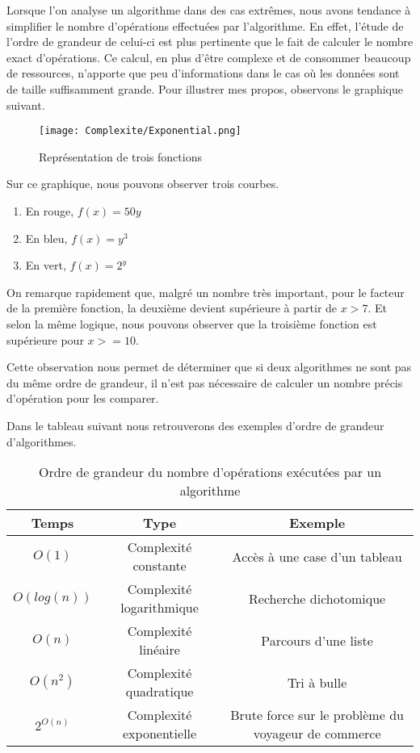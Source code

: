 \documentclass[12pt, twoside, openright]{report}
\begin{document}
Lorsque l'on analyse un algorithme dans des cas extrêmes, nous avons tendance à simplifier le nombre d'opérations effectuées par l'algorithme. En effet, l'étude de l'ordre de grandeur de celui-ci est plus pertinente que le fait de calculer le nombre exact d'opérations. Ce calcul, en plus d'être complexe et de consommer beaucoup de ressources, n'apporte que peu d'informations dans le cas où les données sont de taille suffisamment grande. Pour illustrer mes propos, observons le graphique suivant.

\begin{figure}[H]
    \centering
    \texttt{[image: Complexite/Exponential.png]}
    \caption{Représentation de trois fonctions}
    \label{fig:my_label}
\end{figure}

Sur ce graphique, nous pouvons observer trois courbes.

\begin{enumerate}
    \item En rouge, $f(x)=50y$
    \item En bleu, $f(x)=y^{3}$
    \item En vert, $f(x)=2^{y}$
\end{enumerate}

On remarque rapidement que, malgré un nombre très important, pour le facteur de la première fonction, la deuxième devient supérieure à partir de $x>7$. Et selon la même logique, nous pouvons observer que la troisième fonction est supérieure pour $x>=10$. 

Cette observation nous permet de déterminer que si deux algorithmes ne sont pas du même ordre de grandeur, il n'est pas nécessaire de calculer un nombre précis d'opération pour les comparer.

Dans le tableau suivant nous retrouverons des exemples d'ordre de grandeur d'algorithmes.  \cite{moore02} 
\begin{center}
    \begin{table}[H]
        \begin{tabular}{|c|c|c|}
            \hline 
    Temps & Type & Exemple \\ 
            \hline 
    $O(1)$        &Complexité constante&  Accès à une case d'un tableau\\ 
            \hline 
    $O(log(n))$       & Complexité logarithmique  & Recherche dichotomique \\ 
            \hline 
    $O(n)$        & Complexité linéaire & Parcours d'une liste \\ 
            \hline 
    $O(n^{2})$        & Complexité quadratique  & Tri à bulle \\ 
            \hline 
    $2^{O(n)}$ & Complexité exponentielle & Brute force sur le problème du voyageur de commerce \\
            \hline
        \end{tabular}
    \caption{\label{table:complexite}Ordre de grandeur du nombre d'opérations exécutées par un algorithme}
    \end{table}
\end{center}
\end{document}
